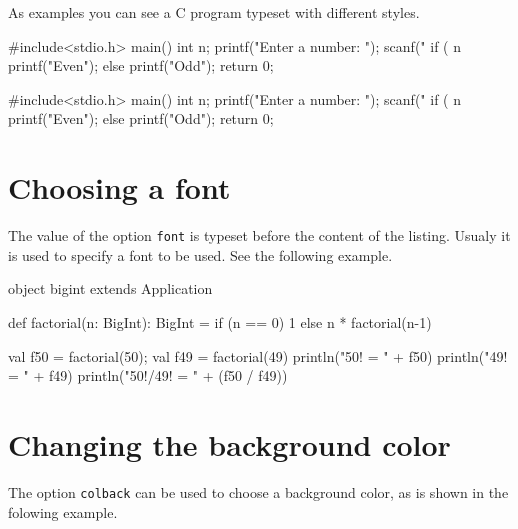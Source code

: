 \documentclass[10pt,a4paper]{article}
\begin{document}
As examples you can see a C program typeset with different styles.

\begin{Example}
\noindent
\begin{minipage}[t]{0.49\linewidth}
  \begin{pygmented}[lang=c,gobble=4,sty=murphy]
    #include<stdio.h> 
    main()
    { int n;
      printf("Enter a number: ");
      scanf("%
      if ( n%
         printf("Even\n");
      else
         printf("Odd\n");
      return 0;
    }
  \end{pygmented}
\end{minipage}
\hfil
\begin{minipage}[t]{0.49\linewidth}
  \begin{pygmented}[lang=c,gobble=4,sty=trac]
    #include<stdio.h> 
    main()
    { int n;
      printf("Enter a number: ");
      scanf("%
      if ( n%
         printf("Even\n");
      else
         printf("Odd\n");
      return 0;
    }
  \end{pygmented}
\end{minipage}
\end{Example}

\section{Choosing a font}

The value of the option \verb|font| is typeset before the content of the
listing. Usualy it is used to specify a font to be used. See the
following example.

\begin{Example}
\begin{pygmented}[lang=scala,font=\rmfamily\scshape\large]
object bigint extends Application {
  def factorial(n: BigInt): BigInt =
    if (n == 0) 1 else n * factorial(n-1)

  val f50 = factorial(50); val f49 = factorial(49)
  println("50! = " + f50)
  println("49! = " + f49)
  println("50!/49! = " + (f50 / f49))
}
\end{pygmented}
\end{Example}

\section{Changing the background color}

The option \verb|colback| can be used to choose a background color, as
is shown in the folowing example.
\end{document}
